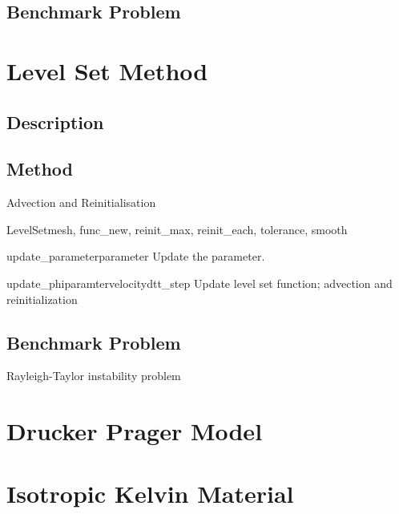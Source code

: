 \subsection{Benchmark Problem}


\section{Level Set Method}

\subsection{Description}

\subsection{Method}

Advection and Reinitialisation

\begin{classdesc}{LevelSet}{mesh, func\_new, reinit\_max, reinit\_each, tolerance, smooth}
\end{classdesc}



\begin{methoddesc}[LevelSet]{update\_parameter}{parameter}
Update the parameter.
\end{methoddesc}

\begin{methoddesc}[LevelSet]{update\_phi}{paramter}{velocity}{dt}{t\_step}
Update level set function; advection and reinitialization
\end{methoddesc}

\subsection{Benchmark Problem}

Rayleigh-Taylor instability problem


\section{Drucker Prager Model}

\section{Isotropic Kelvin Material \label{IKM}}



